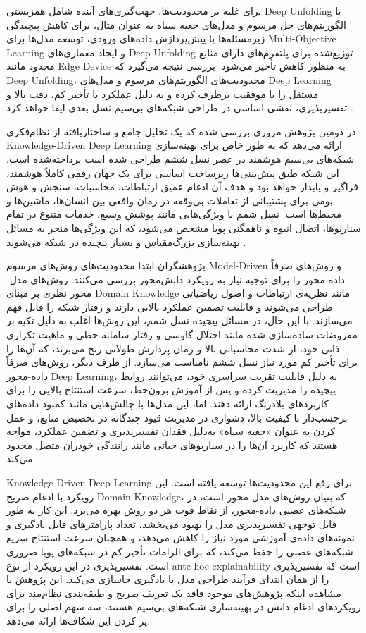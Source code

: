 برای غلبه بر  محدودیت‌ها، جهت‌گیری‌های آینده شامل همزیستی 
\gls{Deep Unfolding}
با الگوریتم‌های حل مرسوم و مدل‌های جعبه سیاه به عنوان مثال، برای کاهش پیچیدگی زیرمسئله‌ها یا پیش‌پردازش داده‌های ورودی، توسعه مدل‌ها برای
\gls{Multi-Objective Learning}
و ایجاد معماری‌های 
\gls{Deep Unfolding}
توزیع‌شده برای پلتفرم‌های دارای منابع محدود مانند 
\gls{Edge Device}
به منظور کاهش تأخیر می‌شود.  بررسی نتیجه می‌گیرد که 
\gls{Deep Unfolding}،
محدودیت‌های الگوریتم‌های مرسوم و مدل‌های 
\gls{Deep Learning}
مستقل را با موفقیت برطرف کرده و به دلیل عملکرد با تأخیر کم، دقت بالا و تفسیرپذیری، نقشی اساسی در طراحی شبکه‌های بی‌سیم نسل بعدی ایفا خواهد کرد
\cite{ComprehensiveReview}.


در دومین پژوهش مروری بررسی شده که یک تحلیل جامع و ساختاریافته از نظام‌فکری 
\gls{Knowledge-Driven Deep Learning}
ارائه می‌دهد که به طور خاص برای بهینه‌سازی شبکه‌های بی‌سیم هوشمند در عصر نسل ششم طراحی شده است پرداخته‌شده است. این شبکه طبق پیش‌بینی‌ها زیرساخت اساسی برای یک جهان رقمی کاملاً هوشمند، فراگیر و پایدار خواهد بود و هدف آن ادغام عمیق ارتباطات، محاسبات، سنجش و هوش بومی برای پشتیبانی از تعاملات بی‌وقفه در زمان واقعی بین انسان‌ها، ماشین‌ها و محیط‌ها است. نسل شمم با ویژگی‌هایی مانند پوشش وسیع، خدمات متنوع در تمام سناریوها، اتصال انبوه و ناهمگنی پویا مشخص می‌شود، که این ویژگی‌ها منجر به مسائل بهینه‌سازی بزرگ‌مقیاس و بسیار پیچیده در شبکه می‌شوند .

پژوهشگران ابتدا محدودیت‌های روش‌های مرسوم 
\gls{Model-Driven}
 و روش‌های صرفاً داده-محور را برای توجیه نیاز به رویکرد دانش‌محور بررسی می‌کنند. روش‌های مدل-محور نظری بر مبنای 
\gls{Domain Knowledge}
  مانند نظریه‌ی ارتباطات و اصول ریاضیاتی طراحی می‌شوند و قابلیت تضمین عملکرد بالایی دارند و رفتار شبکه را قابل فهم می‌سازند. با این حال، در مسائل پیچیده نسل شمم، این روش‌ها اغلب به دلیل تکیه بر مفروضات ساده‌سازی شده مانند اختلال گاوسی و رفتار سامانه خطی و ماهیت تکراری ذاتی خود، از شدت محاسباتی بالا و زمان پردازش طولانی رنج می‌برند، که آن‌ها را برای تأخیر کم مورد نیاز نسل ششم نامناسب می‌سازد. از طرف دیگر، روش‌های صرفاً داده-محور 
\gls{Deep Learning}،
 به دلیل قابلیت تقریب سراسری خود، می‌توانند روابط پیچیده را مدیریت کرده و پس از آموزش برون‌خط، سرعت استنتاج بالایی را برای کاربردهای بلادرنگ ارائه دهند. اما، این مدل‌ها با چالش‌هایی مانند کمبود داده‌های برچسب‌دار با کیفیت بالا، دشواری در مدیریت قیود چندگانه در تخصیص منابع، و عمل کردن به عنوان «جعبه سیاه» به‌دلیل فقدان تفسیرپذیری و تضمین عملکرد، مواجه هستند که کاربرد آن‌ها را در سناریوهای حیاتی مانند رانندگی خودران متصل محدود می‌کند.
 
\gls{Knowledge-Driven Deep Learning}
	 برای رفع این محدودیت‌ها توسعه یافته است. این رویکرد با ادغام صریح 
\gls{Domain Knowledge}،
	  که بنیان روش‌های مدل-محور است، در شبکه‌های عصبی داده-محور، از نقاط قوت هر دو روش بهره می‌برد. این کار به طور قابل توجهی تفسیرپذیری مدل را بهبود می‌بخشد، تعداد پارامترهای قابل یادگیری و نمونه‌های داده‌ی آموزشی مورد نیاز را کاهش می‌دهد، و همچنان سرعت استنتاج سریع شبکه‌های عصبی را حفظ می‌کند، که برای الزامات تأخیر کم در شبکه‌های پویا ضروری است. تفسیرپذیری در این رویکرد از نوع 
\gls{ante-hoc explainability}
	  است که تفسیرپذیری را از همان ابتدای فرآیند طراحی مدل یا یادگیری جاسازی می‌کند.
این پژوهش با مشاهده اینکه پژوهش‌های موجود فاقد یک تعریف صریح و طبقه‌بندی نظام‌مند برای رویکردهای ادغام دانش در بهینه‌سازی شبکه‌های بی‌سیم هستند، سه سهم اصلی را برای پر کردن این شکاف‌ها ارائه می‌دهد.

